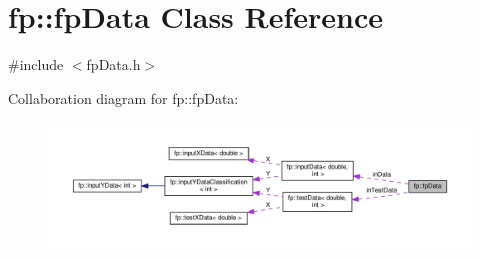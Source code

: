 \hypertarget{classfp_1_1fpData}{}\section{fp\+:\+:fp\+Data Class Reference}
\label{classfp_1_1fpData}


{\ttfamily \#include $<$fp\+Data.\+h$>$}



Collaboration diagram for fp\+:\+:fp\+Data\+:
\nopagebreak
\begin{figure}[H]
\begin{center}
\leavevmode
\includegraphics[width=350pt]{classfp_1_1fpData__coll__graph}
\end{center}
\end{figure}

